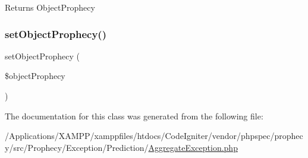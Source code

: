 \begin{DoxyReturn}{Returns}
Object\+Prophecy 
\end{DoxyReturn}
\mbox{\label{class_prophecy_1_1_exception_1_1_prediction_1_1_aggregate_exception_a452ce285c1456d5f97a4b90a73fa86ce}} 
\subsubsection{\texorpdfstring{set\+Object\+Prophecy()}{setObjectProphecy()}}
{\footnotesize\ttfamily set\+Object\+Prophecy (\begin{DoxyParamCaption}\item[{\mbox{\hyperlink{class_prophecy_1_1_prophecy_1_1_object_prophecy}{Object\+Prophecy}}}]{\$object\+Prophecy }\end{DoxyParamCaption})}



The documentation for this class was generated from the following file\+:\begin{DoxyCompactItemize}
\item 
/\+Applications/\+X\+A\+M\+P\+P/xamppfiles/htdocs/\+Code\+Igniter/vendor/phpspec/prophecy/src/\+Prophecy/\+Exception/\+Prediction/\mbox{\hyperlink{_aggregate_exception_8php}{Aggregate\+Exception.\+php}}\end{DoxyCompactItemize}
